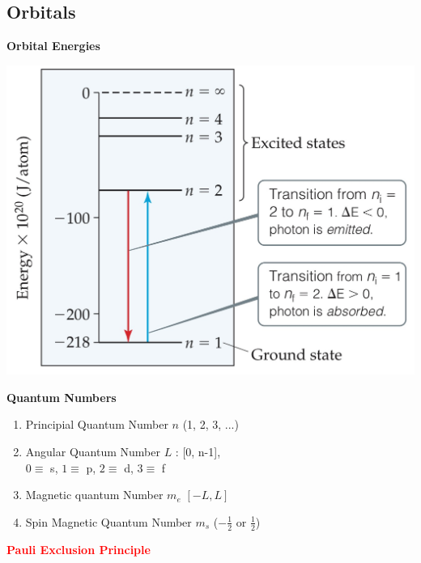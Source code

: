 \subsection{Orbitals}
\begin{minipage}{0.43\columnwidth}
    \textbf{Orbital Energies}
    \begin{center}
        \includegraphics[width = \linewidth]{images/energy_transition_.jpeg}
       
    \end{center}
     \textbf{Quantum Numbers}
    \begin{enumerate}[leftmargin=0.20cm, itemsep=0.05pt]
        \item Principial Quantum Number $n$ (1, 2, 3, ...)
        \item Angular Quantum Number $L$ : [0, n-1],\\
        $0 \equiv$ s, $1 \equiv$ p, $2 \equiv$ d, $3 \equiv$ f
        \item Magnetic quantum Number $m_e$ $[-L, L]$
        \item Spin Magnetic Quantum Number $m_s$ ($-\frac{1}{2}$ or $\frac{1}{2}$)
    \end{enumerate}
    \textcolor{red}{\textbf{Pauli Exclusion Principle}}\\
 
\end{minipage}
